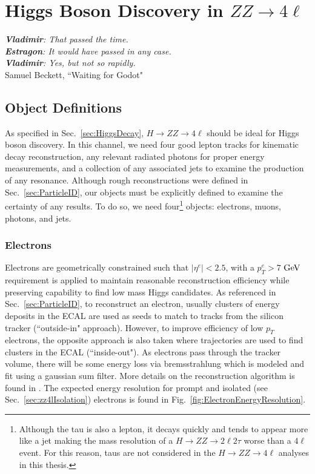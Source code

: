 \chapter{Higgs Boson Discovery in $ZZ\rightarrow4\ell$}
\label{sec:discovery}

\begin{center}
\begin{footnotesize}
\textit{\textbf{Vladimir}: That passed the time.\\
\textbf{Estragon}: It would have passed in any case.\\
\textbf{Vladimir}: Yes, but not so rapidly.}\\
Samuel Beckett, ``Waiting for Godot"
\end{footnotesize}
\end{center}

\section{Object Definitions}
\label{sec:zz4lObjects}

As specified in Sec.~\ref{sec:HiggsDecay}, $H\rightarrow ZZ \rightarrow 4\ell$ should be ideal for Higgs boson discovery. In this channel, we need four good lepton tracks for kinematic decay reconstruction, any relevant radiated photons for proper energy measurements, and a collection of any associated jets to examine the production of any resonance. Although rough reconstructions were defined in Sec.~\ref{sec:ParticleID}, our objects must be explicitly defined to examine the certainty of any results. To do so, we need four\footnote{Although the tau is also a lepton, it decays quickly and tends to appear more like a jet making the mass resolution of a $H\rightarrow ZZ \rightarrow 2\ell2\tau$ worse than a $4\ell$ event. For this reason, taus are not considered in the $H\rightarrow ZZ \rightarrow 4\ell$ analyses in this thesis.} objects: electrons, muons, photons, and jets.

\subsection{Electrons}
\label{sec:zz4lElectrons}

Electrons are geometrically constrained such that $|\eta^e|<2.5$, with a $p_T^e>7$ $\rm{GeV}$ requirement is applied to maintain reasonable reconstruction efficiency while preserving capability to find low mass Higgs candidates. As referenced in Sec.~\ref{sec:ParticleID}, to reconstruct an electron, usually clusters of energy deposits in the ECAL are used as seeds to match to tracks from the silicon tracker (``outside-in" approach). However, to improve efficiency of low $p_T$ electrons, the opposite approach is also taken where trajectories are used to find clusters in the ECAL (``inside-out"). As electrons pass through the tracker volume, there will be some energy loss via bremsstrahlung which is modeled and fit using a gaussian sum filter. More details on the reconstruction algorithm is found in \cite{Baffioni:2006cd,CMS-PAS-EGM-10-004,CMS_DPS_2011-003}. The expected energy resolution for prompt and isolated (see Sec.~\ref{sec:zz4lIsolation}) electrons is found in Fig.~\ref{fig:ElectronEnergyResolution}.

